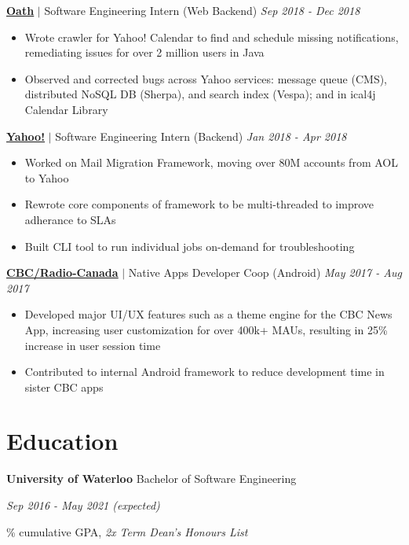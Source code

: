 \documentclass[paper=a4,fontsize=15pt]{scrartcl}
\newcommand{\smolboispace}{\vspace*{0.1em}}
\newcommand{\quarterspace}{\vspace*{0.25em}}
\newcommand{\bighalfspace}{\vspace*{0.75em}}
\begin{document}
\smolboispace
\smolboispace
\bighalfspace
\normalsize
\noindent \href{https://mail.yahoo.com}{\textbf{\ul{Oath}}}
$\vert$ \small Software Engineering Intern (Web Backend)
{\hfill \footnotesize \textit{Sep 2018 - Dec 2018}}
\begin{itemize}[noitemsep,leftmargin=20pt,label=\raisebox{0.25ex}{\tiny$\bullet$},topsep=5pt]
  \small
    \item Wrote crawler for Yahoo! Calendar to find and schedule missing notifications, remediating issues for over 2 million users in Java
    \item Observed and corrected bugs across Yahoo services: message queue (CMS), distributed NoSQL DB (Sherpa), and search index (Vespa); and in ical4j Calendar Library
    
\end{itemize}

\smolboispace
\smolboispace
\bighalfspace
\normalsize
\noindent \href{https://mail.yahoo.com}{\textbf{\ul{Yahoo!}}}
$\vert$ \small Software Engineering Intern (Backend)
{\hfill \footnotesize \textit{Jan 2018 - Apr 2018}}
\begin{itemize}[noitemsep,leftmargin=20pt,label=\raisebox{0.25ex}{\tiny$\bullet$},topsep=5pt]
  \small
    \item Worked on Mail Migration Framework, moving over 80M accounts from AOL to Yahoo
    \item Rewrote core components of framework to be multi-threaded to improve adherance to SLAs
    \item Built CLI tool to run individual jobs on-demand for troubleshooting
\end{itemize}

\smolboispace
\smolboispace
\bighalfspace
\normalsize
\noindent \href{https://cbc.ca}{\ul{\textbf{CBC/Radio-Canada}}}
$\vert$ \small Native Apps Developer Coop (Android)
{\hfill \footnotesize \textit{May 2017 - Aug 2017}}
\begin{itemize}[noitemsep,leftmargin=20pt,label=\raisebox{0.25ex}{\tiny$\bullet$},topsep=5pt]
  \small
    \item Developed major UI/UX features such as a theme engine for the CBC News App, increasing user customization for over 400k+ MAUs, resulting in 25\% increase in user session time
    \item Contributed to internal Android framework to reduce development time in sister CBC apps
\end{itemize}

\section*{Education}{}
\noindent \textbf{University of Waterloo} Bachelor of Software Engineering \par
\quarterspace
\footnotesize
\noindent \textit{Sep 2016 - May 2021 (expected)} \par
{}\% cumulative GPA, \textit{2x Term Dean's Honours List}
\end{document}
